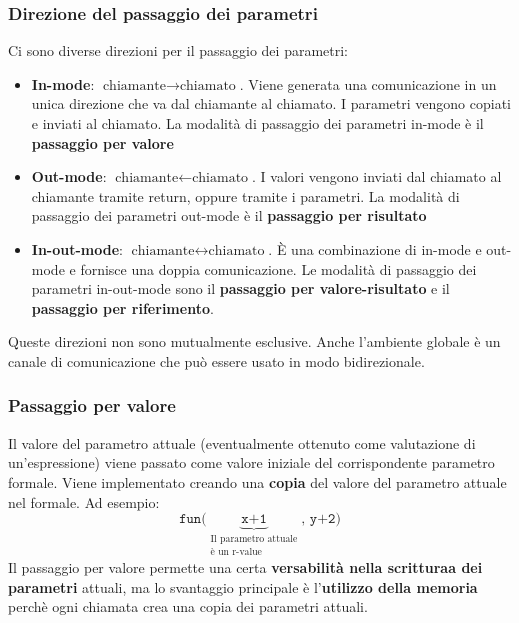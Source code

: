 \documentclass[a4paper]{article}
\begin{document}
\subsubsection{Direzione del passaggio dei parametri}
Ci sono diverse direzioni per il passaggio dei parametri:
\begin{itemize}
  \item \textbf{In-mode}: \( \text{chiamante} \to \text{chiamato} \). Viene generata
    una comunicazione in un unica direzione che va dal chiamante al chiamato.
    I parametri vengono copiati e inviati al chiamato. La modalità di passaggio
    dei parametri in-mode è il \textbf{passaggio per valore}

  \item \textbf{Out-mode}: \( \text{chiamante} \leftarrow \text{chiamato} \).
    I valori vengono inviati dal chiamato al chiamante tramite return, oppure 
    tramite i parametri. La modalità di passaggio dei parametri out-mode è il
    \textbf{passaggio per risultato}

  \item \textbf{In-out-mode}: \( \text{chiamante} \leftrightarrow \text{chiamato} \).
    È una combinazione di in-mode e out-mode e fornisce una doppia comunicazione.
    Le modalità di passaggio dei parametri in-out-mode sono il
    \textbf{passaggio per valore-risultato} e il \textbf{passaggio per riferimento}.
\end{itemize}
Queste direzioni non sono mutualmente esclusive. Anche l'ambiente globale è
un canale di comunicazione che può essere usato in modo bidirezionale.

\subsubsection{Passaggio per valore}
Il valore del parametro attuale (eventualmente ottenuto come valutazione di
un'espressione) viene passato come valore iniziale del
corrispondente parametro formale. Viene implementato creando una \textbf{copia}
del valore del parametro attuale nel formale.
Ad esempio:
\[
  \texttt{fun(}
  \underbrace{\texttt{x+1}}_{
    \substack{
      \text{Il parametro attuale}\\
      \text{è un r-value}
    }
  }
  \texttt{, y+2)}
\] 
Il passaggio per valore permette una certa \textbf{versabilità nella scritturaa dei parametri}
attuali, ma lo svantaggio principale è l'\textbf{utilizzo della memoria} perchè ogni chiamata
crea una copia dei parametri attuali.
\end{document}

